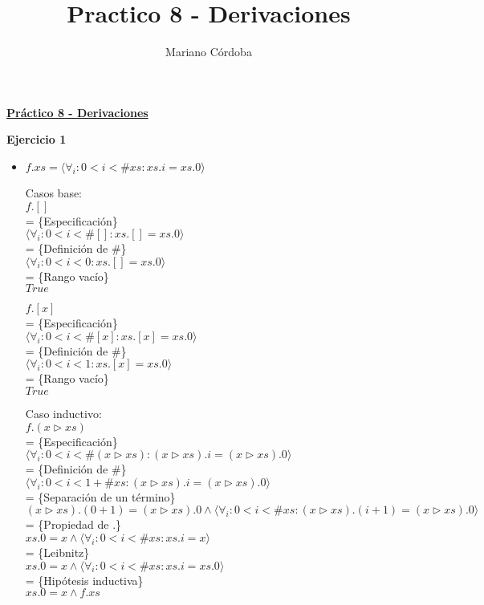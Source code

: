 \documentclass[12pt]{article}
\title{Practico 8 - Derivaciones}
\author{Mariano Córdoba}
\begin{document}
\begin{center}
\large \underline{\textbf{Práctico 8 - Derivaciones}}
\end{center}

\textbf{Ejercicio 1}

\begin{itemize}
    \item $ f.xs = \langle \forall_i : 0 < i < \#xs : xs.i = xs.0 \rangle $

    \bigbreak

    Casos base:\\
    $ f.[] $\\
    = \{Especificación\}\\
    $ \langle \forall_i : 0 < i < \#[] : xs.[] = xs.0 \rangle $\\
    = \{Definición de \#\}\\
    $ \langle \forall_i : 0 < i < 0 : xs.[] = xs.0 \rangle $\\
    = \{Rango vacío\}\\
    $ True $

    \bigbreak

    $ f.[x] $\\
    = \{Especificación\}\\
    $ \langle \forall_i : 0 < i < \#[x] : xs.[x] = xs.0 \rangle $\\
    = \{Definición de \#\}\\
    $ \langle \forall_i : 0 < i < 1 : xs.[x] = xs.0 \rangle $\\
    = \{Rango vacío\}\\
    $ True $

    \bigbreak

    Caso inductivo:\\
    $ f.(x \triangleright xs) $\\
    = \{Especificación\}\\
    $ \langle \forall_i : 0 < i < \#(x \triangleright xs) : (x \triangleright xs).i = (x \triangleright xs).0 \rangle $\\
    = \{Definición de \#\}\\
    $ \langle \forall_i : 0 < i < 1 + \#xs : (x \triangleright xs).i = (x \triangleright xs).0 \rangle $\\
    = \{Separación de un término\}\\
    $ (x \triangleright xs).(0 + 1) = (x \triangleright xs).0 \land \langle \forall_i : 0 < i < \#xs : (x \triangleright xs).(i + 1) = (x \triangleright xs).0 \rangle $\\
    = \{Propiedad de .\}\\
    $ xs.0 = x \land \langle \forall_i : 0 < i < \#xs : xs.i = x \rangle $\\
    = \{Leibnitz\}\\
    $ xs.0 = x \land \langle \forall_i : 0 < i < \#xs : xs.i = xs.0 \rangle $\\
    = \{Hipótesis inductiva\}\\
    $ xs.0 = x \land f.xs $
    

\end{itemize}
\end{document}
